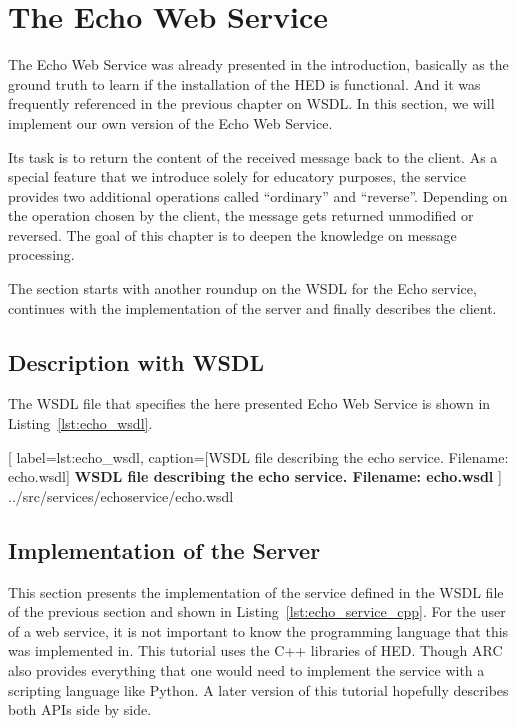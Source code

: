 \chapter{The Echo Web Service}

The Echo Web Service was already presented in the introduction, 
basically as the ground truth to learn if the installation of
the HED is functional. And it was frequently referenced in the previous chapter
on WSDL. In this section, we will implement our own version of the Echo
Web Service.

Its task is to return the content of the received message back to the client.
As a special feature that we introduce solely for educatory purposes, the
service provides two additional operations called ``ordinary'' and ``reverse''.
Depending on the operation chosen by the client, the message gets returned
unmodified or reversed. The goal of this chapter is to deepen the knowledge
on message processing.

The section starts with another roundup on the WSDL for the Echo service,
continues with the implementation of the server and finally describes the
client.

\section{Description with WSDL}

The WSDL file that specifies the here presented Echo Web Service is shown in
Listing~\ref{lst:echo_wsdl}.

	[
	label=lst:echo_wsdl,
	caption={[WSDL file describing the echo service. Filename: echo.wsdl]
	\textbf{WSDL file describing the echo service. Filename: echo.wsdl}}
	]
{../src/services/echoservice/echo.wsdl}


\section{Implementation of the Server}

This section presents the implementation of the service defined in the WSDL
file of the previous section and shown in
Listing~\ref{lst:echo_service_cpp}. For the user of a web service, it is not
important to know the programming language that this was implemented in. This
tutorial uses the C++ libraries of HED. Though ARC also provides everything
that one would need to implement the service with a scripting language like
Python. A later version of this tutorial hopefully describes both APIs side by
side.

